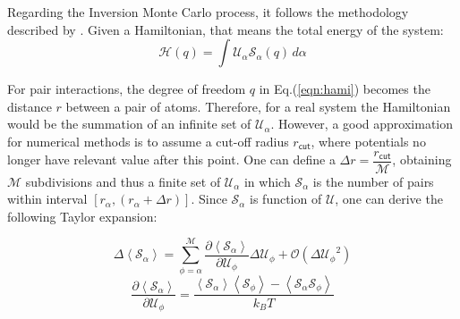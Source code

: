 \documentclass[10pt,a4paper,twoside]{article}
\begin{document}
 Regarding the Inversion Monte Carlo process, it follows the methodology described by . Given a Hamiltonian, that means the total energy of the system:
 \begin{equation}
\mathcal{H}(q) = \displaystyle \int \mathcal{U}_\alpha\mathcal{S}_\alpha(q) \,d\alpha
\label{eqn:hami}
\end{equation}

For pair interactions, the degree of freedom $q$ in Eq.(\ref{eqn:hami}) becomes the distance $r$ between a pair of atoms. Therefore, for a real system the Hamiltonian would be the summation of an infinite set of $\mathcal{U}_\alpha$. However, a good approximation for numerical methods is to assume a cut-off radius $r_{\mathsf{cut}}$, where potentials no longer have relevant value after this point. One can define a $\Delta r = \dfrac{r_{\mathsf{cut}}}{\mathcal{M}}$, obtaining $\mathcal{M}$ subdivisions and thus a finite set of  $\mathcal{U}_{\alpha}$ in which $\mathcal{S}_\alpha$ is the number of pairs within  interval $[r_\alpha,(r_\alpha + \Delta r)]$. Since $\mathcal{S}_\alpha$ is function of $\mathcal{U}$, one can derive the following Taylor expansion:

 \begin{equation}
\Delta\left\langle\mathcal{S}_\alpha\right\rangle = \sum_{\phi=\alpha}^\mathcal{M}\dfrac{\partial\left\langle\mathcal{S}_\alpha\right\rangle}{\partial\mathcal{U}_\phi}\Delta\mathcal{U}_\phi + \mathcal{O}({\Delta\mathcal{U}_\phi}^2)
\label{eqn:inv1}
\end{equation}
 \begin{equation}
\dfrac{\partial\left\langle\mathcal{S}_\alpha\right\rangle}{\partial\mathcal{U}_\phi} = \dfrac{ \left\langle\mathcal{S}_\alpha\right\rangle\left\langle\mathcal{S}_\phi\right\rangle - \left\langle\mathcal{S}_\alpha\mathcal{S}_\phi\right\rangle}{k_B T}
\label{eqn:inv2}
\end{equation}
\end{document}
